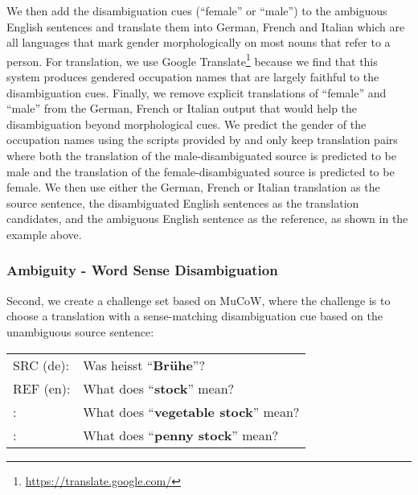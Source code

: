 \documentclass[11pt]{article}
\newcommand{\cmark}{\textcolor{darkpastelgreen}{\ding{51}}}\newcommand{\xmark}{\textcolor{darkpastelred}{\ding{55}}}
\begin{document}
We then add the disambiguation cues (``female'' or ``male'') to the ambiguous English sentences and translate them into German, French and Italian which are all languages that mark gender morphologically on most nouns that refer to a person. For translation, we use Google Translate\footnote{\url{https://translate.google.com/}} because we find that this system produces gendered occupation names that are largely faithful to the disambiguation cues. Finally, we remove explicit translations of ``female'' and ``male'' from the German, French or Italian output that would help the disambiguation beyond morphological cues. We predict the gender of the occupation names using the scripts provided by \citet{stanovsky-etal-2019-evaluating} and only keep translation pairs where both the translation of the male-disambiguated source is predicted to be male and the translation of the female-disambiguated source is predicted to be female. We then use either the German, French or Italian translation as the source sentence, the disambiguated English sentences as the translation candidates, and the ambiguous English sentence as the reference, as shown in the example above.

\subsubsection{Ambiguity - Word Sense Disambiguation}
\label{subsec:wsd}
Second, we create a challenge set based on MuCoW, where the challenge is to choose a translation with a sense-matching disambiguation cue based on the unambiguous source sentence:

\begin{small}
\vspace{0.5cm}
\setlength{\extrarowheight}{0.1cm}
\begin{tabular}{ll}
     SRC (de): &  Was heisst ``\textbf{Brühe}''?\\
     REF (en): & What does ``\textbf{stock}'' mean?\\
     \cmark: & What does ``\textbf{vegetable stock}'' mean?\\
     \xmark: & What does ``\textbf{penny stock}'' mean? \vspace{0.35cm}
\end{tabular}
\end{small}
\end{document}
